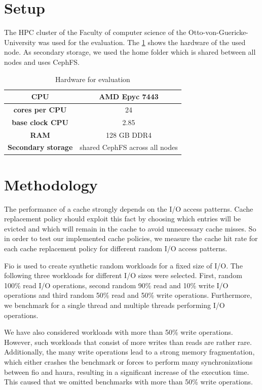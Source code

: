\documentclass[
	12pt,
	a4paper,
	abstract,
	bibliography=totoc,
	chapterprefix,
	headings=openright,
	numbers=endperiod,
	parskip=half,
	twoside,
]{scrreprt}
\begin{document}
\section{Setup}
\label{sec:setup}

The HPC cluster of the Faculty of computer science of the Otto-von-Guericke-University was used for the evaluation.
The \cref{tab:hardware node} shows the hardware of the used node.
As secondary storage, we used the home folder which is shared between all nodes and uses CephFS.

\begin{table}[ht]
	\centering
	\begin{tabular}{|c|c|}
		\hline
		\textbf{CPU} & AMD Epyc 7443\\
		\hline
		\textbf{cores per CPU} & 24\\
		\hline
		\textbf{base clock CPU} & 2.85\\
		\hline
		\textbf{RAM} & 128 GB DDR4\\
		\hline
		\textbf{Secondary storage} & shared CephFS across all nodes \\
		\hline
	\end{tabular}
	\caption{Hardware for evaluation}
	\label{tab:hardware node}
\end{table}


\section{Methodology}
\label{sec:methodology}

The performance of a cache strongly depends on the I/O access patterns.
Cache replacement policy should exploit this fact by 
choosing which entries will be evicted and which will remain in the cache 
to avoid unnecessary cache misses.
So in order to test our implemented cache policies,
we measure the cache hit rate for each cache replacement policy for different 
random I/O access patterns.

Fio is used to create synthetic random workloads for a fixed size of I/O.
The following three workloads for different I/O sizes were selected.
First, random 100\% read I/O operations, second random 90\% read and 10\% write I/O operations
and third random 50\% read and 50\% write operations. 
Furthermore, we benchmark for a single thread and multiple threads performing I/O operations.

We have also considered workloads with more than 50\% write operations.
However, such workloads that consist of more writes than reads are rather rare. 
Additionally, the many write operations lead to a strong memory fragmentation, 
which either crashes the benchmark or forces to perform many synchronizations between fio and haura, 
resulting in a significant increase of the execution time.
This caused that we omitted benchmarks with more than 50\% write operations.
\end{document}
